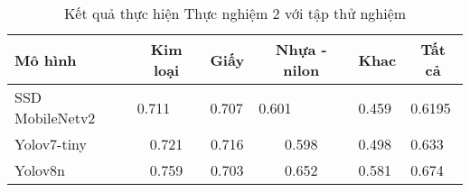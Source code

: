 \documentclass[../the.tex]{subfiles}
\begin{document}
\begin{table}[ht!]
    \centering
    \caption{Kết quả thực hiện Thực nghiệm 2 với tập thử nghiệm}
    \begin{tabular}{|l|c|c|c|l|l|}
        \hline
        \textbf{Mô hình}  & \textbf{Kim loại}          & \textbf{Giấy}              & \textbf{Nhựa - nilon}      & \multicolumn{1}{c|}{\textbf{Khac}} & \multicolumn{1}{c|}{\textbf{Tất cả}} \\ \hline
        SSD   MobileNetv2 & \multicolumn{1}{l|}{0.711} & \multicolumn{1}{l|}{0.707} & \multicolumn{1}{l|}{0.601} & 0.459                              & 0.6195                               \\ \hline
        Yolov7-tiny       & 0.721                      & 0.716                      & 0.598                      & 0.498                              & 0.633                                \\ \hline
        Yolov8n           & 0.759                      & 0.703                      & 0.652                      & 0.581                              & 0.674                                \\ \hline
    \end{tabular}
    \label{tab:thucnghiem2.2}
\end{table}
\end{document}
